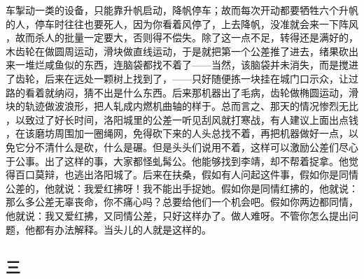 车掣动一类的设备，只能靠升帆启动，降帆停车；故而每次开动都要牺牲六个升帆 的人，停车时往往也要死人，因为你看着风停了，上去降帆，没准就会来一下阵风 ，故而杀人的批量一定要大，否则得不偿失。除了这一点不足，转得还是满好的， 木齿轮在做圆周运动，滑块做直线运动，于是就把第一个公差推了进去，绪果砍出 来一堆烂咸鱼似的东西，连脑袋都找不着了——当然，该脑袋并未消失，而是搅进 了齿轮，后来在远处一颗树上找到了，——只好随便拣一块挂在城门口示众，让过 路的看着就纳闷，猜不出是什么东西。后来那机器出了毛病，齿轮做椭圆运动，滑 块的轨迹做波浪形，把人轧成内燃机曲轴的样于。总而言之、那天的情况惨烈无比 ，以致过了好长时间，洛阳城里的公差一听见刮风就打寒战，有人建议上面出点钱 ，在该磨坊周围加一圈绳网，免得砍下来的人头总找不着，再把机器做好一点，以 免它分不清什么是砍，什么是碾。但是头头们说用不着，这样可以激励公差们尽心 于公事。出了这样的事，大家都怪虬髯公。他能够找到李靖，却不帮着捉拿。他觉 得百口莫辩，也逃出洛阳城了。后来在扶桑，假如有人问起这件事，假如你是同情 公差的，他就说：我爱红拂呀！我不能出手捉她。假如你是同情红拂的，他就说： 那么多公差无辜丧命，你不痛心吗？总要给他们一个机会吧。假如你两边都同情， 他就说：我又爱红拂，又同情公差，只好这样办了。做人难呀。不管你怎么提出问 题，他都有办法解释。当头儿的人就是这样的。 
 
 
\subsection{三} 
 
